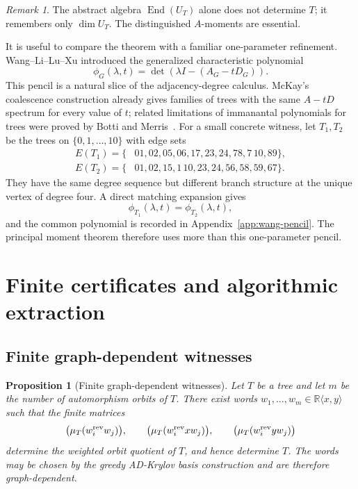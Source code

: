 \documentclass[a4paper,fleqn]{cas-sc}
\newtheorem{proposition}[theorem]{Proposition}
\theoremstyle{definition}
\theoremstyle{remark}
\newtheorem{remark}[theorem]{Remark}
\newcommand{\R}{\mathbb R}
\newcommand{\End}{\operatorname{End}}
\begin{document}
\begin{remark}
The abstract algebra \(\End(U_T)\) alone does not determine \(T\); it remembers only
\(\dim U_T\).  The distinguished \(A\)-moments are essential.
\end{remark}



It is useful to compare the theorem with a familiar one-parameter refinement.
Wang--Li--Lu--Xu introduced the generalized characteristic polynomial
\cite{WangLiLuXu2011}
\[
        \phi_G(\lambda,t)=\det(\lambda I-(A_G-tD_G)).
\]
This pencil is a natural slice of the adjacency-degree calculus.  McKay's
coalescence construction already gives families of trees with the same
$A-tD$ spectrum for every value of $t$; related limitations of immanantal
polynomials for trees were proved by Botti and Merris~\cite{BottiMerris1993}.
For a small concrete witness, let $T_1,T_2$ be the trees on
$\{0,1,\ldots,10\}$ with edge sets
\[
\begin{aligned}
E(T_1)=\{&01,02,05,06,17,23,24,78,7\,10,89\},\\
E(T_2)=\{&01,02,15,1\,10,23,24,56,58,59,67\}.
\end{aligned}
\]
They have the same degree sequence but different branch structure at the unique
vertex of degree four.  A direct matching expansion gives
\[
        \phi_{T_1}(\lambda,t)=\phi_{T_2}(\lambda,t),
\]
and the common polynomial is recorded in Appendix~\ref{app:wang-pencil}.  The
principal moment theorem therefore uses more than this one-parameter pencil.


\section{Finite certificates and algorithmic extraction}\label{sec:algorithmic-extraction}
\subsection{Finite graph-dependent witnesses}

\begin{proposition}[Finite graph-dependent witnesses]
\label{prop:finite-witnesses}
Let $T$ be a tree and let $m$ be the number of automorphism orbits of $T$.  There
exist words $w_1,\ldots,w_m\in\R\langle x,y\rangle$ such that the finite matrices
\[
        \bigl(\mu_T(w_i^{\rm rev}w_j)\bigr),
        \qquad
        \bigl(\mu_T(w_i^{\rm rev}xw_j)\bigr),
        \qquad
        \bigl(\mu_T(w_i^{\rm rev}yw_j)\bigr)
\]
determine the weighted orbit quotient of $T$, and hence determine $T$.
The words may be chosen by the greedy AD-Krylov basis construction and are
therefore graph-dependent.
\end{proposition}
\end{document}
